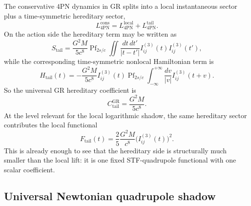 \documentclass[11pt]{article}
\begin{document}
The conservative $4$PN dynamics in GR splits into a local instantaneous sector
plus a time-symmetric hereditary sector,
\begin{equation}
L_{4\mathrm{PN}}^{\mathrm{cons}}
=
L_{4\mathrm{PN}}^{\mathrm{local}}
+
L_{4\mathrm{PN}}^{\mathrm{tail}}.
\label{eq:app-tail-gr-split}
\end{equation}
On the action side the hereditary term may be written as
\begin{equation}
S_{\mathrm{tail}}
=
\frac{G^2 M}{5c^8}
\operatorname{Pf}_{2s/c}
\iint \frac{dt\,dt'}{|t-t'|}
I_{ij}^{(3)}(t)
I_{ij}^{(3)}(t'),
\label{eq:app-tail-action}
\end{equation}
while the corresponding time-symmetric nonlocal Hamiltonian term is
\begin{equation}
H_{\mathrm{tail}}(t)
=
-
\frac{G^2 M}{5c^8}
I_{ij}^{(3)}(t)
\operatorname{Pf}_{2s/c}
\int_{-\infty}^{+\infty}
\frac{dv}{|v|}
I_{ij}^{(3)}(t+v).
\label{eq:app-tail-hamiltonian}
\end{equation}
So the universal GR hereditary coefficient is
\begin{equation}
C_{\mathrm{tail}}^{\mathrm{GR}}
=
\frac{G^2 M}{5c^8}.
\label{eq:app-tail-gr-coefficient}
\end{equation}
At the level relevant for the local logarithmic shadow, the same hereditary
sector contributes the local functional
\begin{equation}
F_{\mathrm{tail}}(t)
=
\frac{2}{5}\frac{G^2 M}{c^8}
\bigl(I_{ij}^{(3)}(t)\bigr)^2.
\label{eq:app-tail-local-functional}
\end{equation}
This is already enough to see that the hereditary side is structurally much
smaller than the local lift: it is one fixed STF-quadrupole functional with one
scalar coefficient.

\subsection{Universal Newtonian quadrupole shadow}
\label{app:tail-newtonian-shadow}
\end{document}
